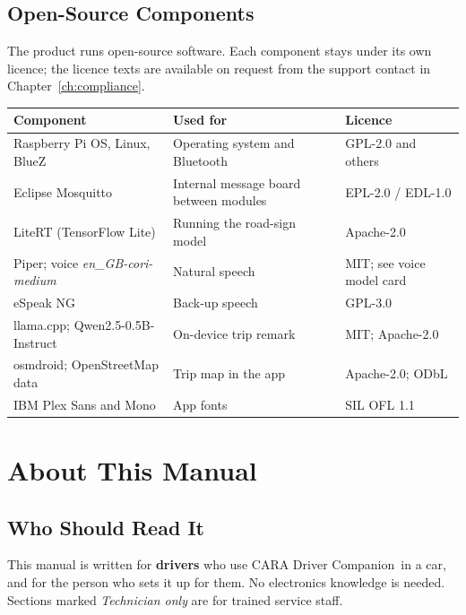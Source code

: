 \documentclass[11pt,a4paper,oneside]{report}
\newcommand{\hdr}[1]{\cellcolor{LightBlue}\textbf{#1}}
\newcommand{\ProductName}{CARA Driver Companion}
\begin{document}
\section*{Open-Source Components}
The product runs open-source software. Each component stays under its own licence; the licence texts are available on request from the support contact in Chapter~\ref{ch:compliance}.
\begin{table}[H]\centering\small
\begin{tabularx}{\linewidth}{|l|X|l|}\hline
\hdr{Component} & \hdr{Used for} & \hdr{Licence}\\ \hline
Raspberry Pi OS, Linux, BlueZ & Operating system and Bluetooth & GPL-2.0 and others\\ \hline
Eclipse Mosquitto & Internal message board between modules & EPL-2.0 / EDL-1.0\\ \hline
LiteRT (TensorFlow Lite) & Running the road-sign model & Apache-2.0\\ \hline
Piper; voice \emph{en\_GB-cori-medium} & Natural speech & MIT; see voice model card\\ \hline
eSpeak NG & Back-up speech & GPL-3.0\\ \hline
llama.cpp; Qwen2.5-0.5B-Instruct & On-device trip remark & MIT; Apache-2.0\\ \hline
osmdroid; OpenStreetMap data & Trip map in the app & Apache-2.0; ODbL\\ \hline
IBM Plex Sans and Mono & App fonts & SIL OFL 1.1\\ \hline
\end{tabularx}\end{table}

\clearpage
\tableofcontents
\clearpage
\listoffigures
\clearpage
\listoftables
\clearpage
{}

\chapter*{About This Manual}
\section*{Who Should Read It}
This manual is written for \textbf{drivers} who use \ProductName\ in a car, and for the person who sets it up for them. No electronics knowledge is needed. Sections marked \emph{Technician only} are for trained service staff.
\end{document}
